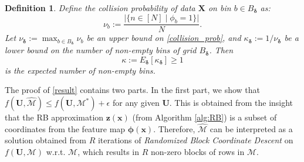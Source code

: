 \documentclass[sigconf]{acmart}
\newtheorem{definition}{Definition}
\newcommand{\1}{\boldsymbol{1}}
\newcommand{\bx}{\boldsymbol{x}}
\newcommand{\bz}{\boldsymbol{z}}
\newcommand{\bX}{\mathbf{X}}
\newcommand{\bU}{\mathbf{U}}
\newcommand{\cM}{\mathcal{M}}
\newcommand{\cMh}{\widehat{\cM}}
\newcommand{\bdelta}{\boldsymbol{\delta}}
\newcommand{\bphi}{\boldsymbol{\phi}}
\newcommand{\0}{\boldsymbol{0}}
\begin{document}
\begin{definition}\label{def:collision_prob}
Define the collision probability of data $\bX$ on bin $b\in B_{\bdelta}$ as: 
\begin{equation}\label{collision_prob}
     \nu_{b}:=\frac{ |\{n\in[N] \;|\; \phi_{b}=1 \}| }{N}.
\end{equation}
Let $\nu_{\bdelta} := \max_{b\in B_{\bdelta}} \nu_b$ be an upper bound on \eqref{collision_prob}, and $\kappa_{\bdelta}:=1/\nu_{\bdelta}$ be a lower bound on the number of non-empty bins of grid $B_{\bdelta}$. Then
\begin{equation}\label{expected_col_prob}
    \kappa:= E_{\bdelta}[\kappa_{\bdelta}] \geq 1
\end{equation}
is the expected number of non-empty bins.
\end{definition}

The proof of \eqref{result} contains two parts. In the first part, we show that $f(\bU,\cMh)\leq f(\bU,\cM^*)+\epsilon$ for any given $\bU$. This is obtained from the insight that the RB approximation $\bz(\bx)$ (from Algorithm \ref{alg:RB}) is a subset of coordinates from the feature map $\bphi(\bx)$. Therefore, $\cMh$ can be interpreted as a solution obtained from $R$ iterations of \emph{Randomized Block Coordinate Descent} on $f(\bU,\cM)$ w.r.t. $\cM$, which results in $R$ non-zero blocks of rows in $\cM$.
\end{document}
